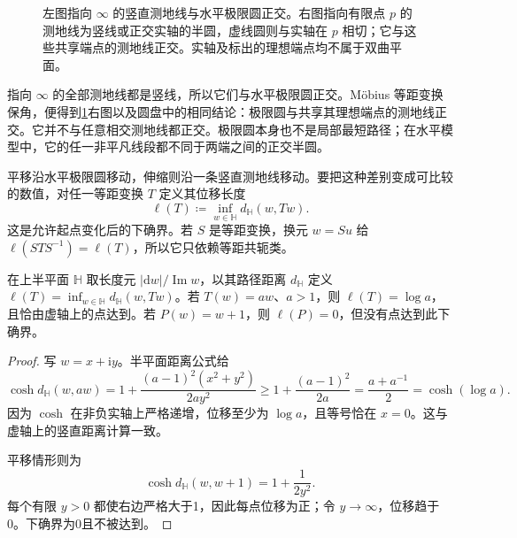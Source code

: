 \begin{figure}[htbp]
\centering
{}
\caption[测地线与极限圆]{左图指向 \(\infty\) 的竖直测地线与水平极限圆正交。右图指向有限点 \(p\) 的测地线为竖线或正交实轴的半圆，虚线圆则与实轴在 \(p\) 相切；它与这些共享端点的测地线正交。实轴及标出的理想端点均不属于双曲平面。}
\label{b3:fig:13-geodesics-horocycles}
\end{figure}

指向 \(\infty\) 的全部测地线都是竖线，所以它们与水平极限圆正交。Möbius 等距变换保角，便得到\cref{b3:fig:13-geodesics-horocycles}右图以及圆盘中的相同结论：极限圆与共享其理想端点的测地线正交。它并不与任意相交测地线都正交。极限圆本身也不是局部最短路径；在水平模型中，它的任一非平凡线段都不同于两端之间的正交半圆。

\ProseParagraphBreak
平移沿水平极限圆移动，伸缩则沿一条竖直测地线移动。要把这种差别变成可比较的数值，对任一等距变换 \(T\) 定义其位移长度
\[
 \ell(T)\coloneqq\inf_{w\in\mathbb H}d_{\mathbb H}(w,Tw).
\]
这是允许起点变化后的下确界。若 \(S\) 是等距变换，换元 \(w=Su\) 给
\(\ell(STS^{-1})=\ell(T)\)，所以它只依赖等距共轭类。

\begin{proposition}[平移与伸缩的位移长度]\label{b3:prop:13-deck-displacement}
在上半平面 \(\mathbb H\) 取长度元 \(|\mathrm dw|/\operatorname{Im}w\)，以其路径距离 \(d_{\mathbb H}\) 定义 \(\ell(T)=\inf_{w\in\mathbb H}d_{\mathbb H}(w,Tw)\)。若 \(T(w)=aw\)、\(a>1\)，则 \(\ell(T)=\log a\)，且恰由虚轴上的点达到。若 \(P(w)=w+1\)，则 \(\ell(P)=0\)，但没有点达到此下确界。
\end{proposition}
\begin{proof}
写 \(w=x+\mathrm iy\)。半平面距离公式给
\[
 \cosh d_{\mathbb H}(w,aw)
 =1+\frac{(a-1)^2(x^2+y^2)}{2ay^2}
 \ge1+\frac{(a-1)^2}{2a}
 =\frac{a+a^{-1}}2=\cosh(\log a).
\]
因为 \(\cosh\) 在非负实轴上严格递增，位移至少为 \(\log a\)，且等号恰在 \(x=0\)。这与虚轴上的竖直距离计算一致。

平移情形则为
\[
 \cosh d_{\mathbb H}(w,w+1)=1+\frac1{2y^2}.
\]
每个有限 \(y>0\) 都使右边严格大于1，因此每点位移为正；令 \(y\to\infty\)，位移趋于0。下确界为0且不被达到。
\end{proof}

